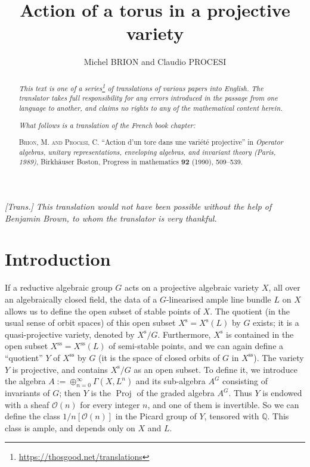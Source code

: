 \documentclass{article}
\title{Action of a torus in a projective variety}
\author{Michel BRION and Claudio PROCESI}
\date{}
\newcommand{\doctype}{French book chapter}
\newcommand{\origcit}{%
  \textsc{Brion, M. and Procesi, C.}
  ``Action d'un tore dans une vari\'{e}t\'{e} projective''
  in \emph{Operator algebras, unitary representations, enveloping algebras, and invariant theory (Paris, 1989)}, Birkh\"{a}user Boston, Progress in mathematics \textbf{92} (1990), 509--539.%
}
\newcommand{\scr}[1]{{\mathscr{#1}}}
\newcommand{\s}{\mathrm{s}}
\renewcommand{\ss}{\mathrm{ss}}
\DeclareMathOperator{\Proj}{Proj}
\begin{document}
\maketitle
\thispagestyle{fancy}

\renewcommand{\abstractname}{Translator's note.}

\begin{abstract}
  \renewcommand*{\thefootnote}{\fnsymbol{footnote}}
  \emph{This text is one of a series\footnote{\url{https://thosgood.net/translations}} of translations of various papers into English.}
  \emph{The translator takes full responsibility for any errors introduced in the passage from one language to another, and claims no rights to any of the mathematical content herein.}

  \medskip
  
  \emph{What follows is a translation of the \doctype:}

  \medskip\noindent
  \origcit
\end{abstract}

\setcounter{footnote}{0}

\tableofcontents
\bigskip



\emph{[Trans.] This translation would not have been possible without the help of Benjamin Brown, to whom the translator is very thankful.}

\section*{Introduction}
\label{introduction}

If a reductive algebraic group $G$ acts on a projective algebraic variety $X$, all over an algebraically closed field, the data of a $G$-linearised ample line bundle $L$ on $X$ allows us to define the open subset of stable points of $X$.
The quotient (in the usual sense of orbit spaces) of this open subset $X^\s=X^\s(L)$ by $G$ exists;
it is a quasi-projective variety, denoted by $X^\s/G$.
Furthermore, $X^\s$ is contained in the open subset $X^\ss=X^\ss(L)$ of semi-stable points, and we can again define a ``quotient'' $Y$ of $X^\ss$ by $G$ (it is the space of closed orbits of $G$ in $X^\ss$).
The variety $Y$ is projective, and contains $X^\s/G$ as an open subset.
To define it, we introduce the algebra $A:=\oplus_{n=0}^\infty \Gamma(X,L^n)$ and its sub-algebra $A^G$ consisting of invariants of $G$;
then $Y$ is the $\Proj$ of the graded algebra $A^G$.
Thus $Y$ is endowed with a sheaf $\scr{O}(n)$ for every integer $n$, and one of them is invertible.
So we can define the class $1/n[\scr{O}(n)]$ in the Picard group of $Y$, tensored with $\mathbb{Q}$.
This class is ample, and depends only on $X$ and $L$.
\end{document}
